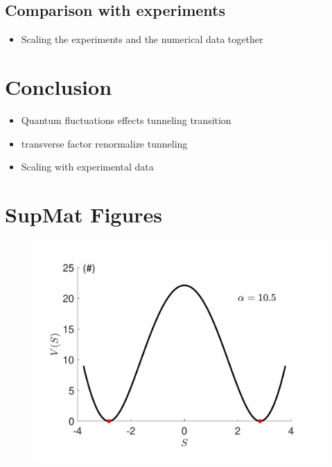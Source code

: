 \documentclass[prb,twocolumn,showpacs,preprintnumbers,amsmath,amssymb, superscriptaddress]{revtex4-2}
\newcommand{\1}{{1\hspace*{-0.5ex} \textrm{l} \hspace*{0.5ex}}}
\begin{document}
\subsection{Comparison with experiments}
\begin{itemize}
\item Scaling the experiments and the numerical data together
\end{itemize}

	
\section{Conclusion}
\begin{itemize}
\item Quantum fluctuations effects tunneling transition
\item transverse factor renormalize tunneling
\item Scaling with experimental data
\end{itemize}

  

     
 
        
\newpage
\newpage 
\pagebreak
\section{SupMat Figures}


	
	\begin{figure}[h!]
		\begin{center}
			\includegraphics[width=0.9\columnwidth]{SupMatFig_EffectivePotential.pdf}
			
			\caption{  }
			\label{fig:gap}
		\end{center}
	\end{figure}
	
\end{document}

